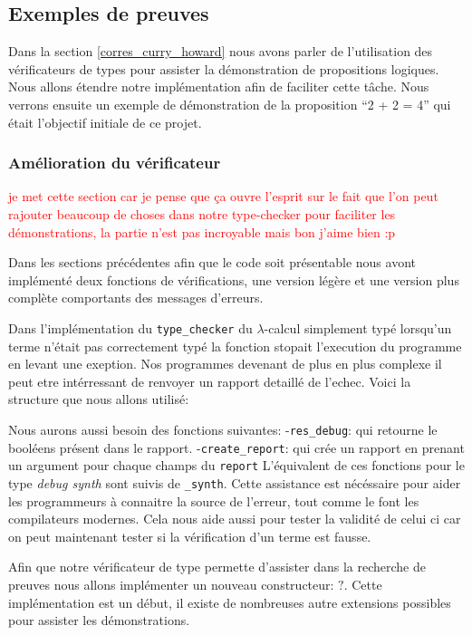 \documentclass {article}
\newcommand{\codefrom}[3]
           {}
\theoremstyle{definition}
\theoremstyle{remark}
\newcommand{\todo}[1]{\textcolor{red}{#1}}
\newcommand{\fun}[1]{\lstinline!#1!}
\begin{document}
\subsection{Exemples de preuves}
\label{ex_preuves}

Dans la section \ref{corres_curry_howard} nous avons parler de l'utilisation des vérificateurs de types
pour assister la démonstration de propositions logiques. Nous allons étendre notre implémentation afin
de faciliter cette tâche.
Nous verrons ensuite un exemple de démonstration de la proposition 
``2 + 2 = 4'' qui était l'objectif initiale de ce projet.


\subsubsection{Amélioration du vérificateur}
\todo{je met cette section car je pense que ça ouvre l'esprit sur le fait que l'on peut rajouter beaucoup de choses dans notre type-checker
  pour faciliter les démonstrations, la partie n'est pas incroyable mais bon j'aime bien :p }

Dans les sections précédentes afin que le code soit présentable nous avont implémenté deux fonctions de vérifications, une version légère
et une version plus complète comportants des messages d'erreurs.

Dans l'implémentation du \fun{type_checker} du $\lambda$-calcul simplement typé lorsqu'un terme n'était pas
correctement typé la fonction stopait l'execution du programme en levant une exeption.
Nos programmes devenant de plus en plus complexe il peut etre intérressant de renvoyer un rapport detaillé
de l'echec. Voici la structure que nous allons utilisé:

\codefrom{dependent}{lambda}{debug}

Nous aurons aussi besoin des fonctions suivantes: 
-\fun{res_debug}: qui retourne le booléens présent dans le rapport.    
-\fun{create_report}: qui crée un rapport en prenant un argument pour chaque champs du \fun{report}
L'équivalent de ces fonctions pour le type \emph{debug synth} sont suivis de \fun{_synth}.
Cette assistance est nécéssaire pour aider les programmeurs à connaitre la source de l'erreur,
tout comme le font les compilateurs modernes. Cela nous aide aussi pour tester la validité de celui 
ci car on peut maintenant tester si la vérification d'un terme est fausse.

Afin que notre vérificateur de type permette d'assister dans la recherche de preuves
nous allons implémenter un nouveau constructeur: $?$.
Cette implémentation est un début, il existe de nombreuses autre extensions possibles
pour assister les démonstrations.
\end{document}

